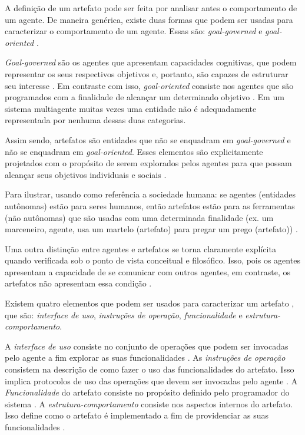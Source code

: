 A definição de um artefato pode ser feita por analisar antes o comportamento de um agente. De maneira genérica, existe duas formas que podem ser usadas para caracterizar o comportamento de um agente. Essas são: \textit{goal-governed} e \textit{goal-oriented} \cite{relationwithagentprogram} \cite{programingagentartefact}.

\textit{Goal-governed} são os agentes que apresentam capacidades cognitivas, que podem representar os seus respectivos objetivos e, portanto, são capazes de estruturar seu interesse \cite{relationwithagentprogram} \cite{programingagentartefact}. Em contraste com isso, \textit{goal-oriented} consiste nos agentes que são programados com a finalidade de alcançar um determinado objetivo \cite{relationwithagentprogram} \cite{programingagentartefact}. Em um sistema multiagente muitas vezes
uma entidade não é adequadamente representada por nenhuma dessas duas categorias. 

Assim sendo, artefatos são entidades que não se enquadram em  \textit{goal-governed} e não se enquadram em \textit{goal-oriented}. Esses elementos são explicitamente projetados com o propósito de serem explorados pelos agentes para que possam alcançar seus objetivos individuais e sociais \cite{programingagentartefact} \cite{cartago}. 

Para ilustrar, usando como referência a sociedade humana: se agentes (entidades autônomas) estão para seres humanos, então artefatos estão para as ferramentas (não autônomas) que são usadas com uma determinada finalidade (ex. um marceneiro, agente, usa um martelo (artefato) para pregar um prego (artefato)) \cite{programingagentartefact}.

Uma outra distinção entre agentes e artefatos se torna claramente explícita quando verificada sob o ponto de vista conceitual e filosófico. Isso, pois os agentes apresentam a capacidade de se comunicar com outros agentes, em contraste, os artefatos não apresentam essa condição \cite{programingagentartefact}.

Existem quatro elementos que podem ser usados para caracterizar um artefato \cite{programingagentartefact}, que são: \textit{interface de uso}, \textit{instruções de operação}, \textit{funcionalidade} e \textit{estrutura-comportamento}.

A \textit{interface de uso} consiste no conjunto de operações que podem ser invocadas pelo agente a fim explorar as suas funcionalidades \cite{programingagentartefact}. As \textit{instruções de operação} consistem na descrição de como fazer o uso das funcionalidades do artefato. Isso implica protocolos de uso das operações que devem ser invocadas pelo agente \cite{programingagentartefact}. A \textit{Funcionalidade} do artefato consiste no propósito definido pelo programador do sistema \cite{programingagentartefact}. A \textit{estrutura-comportamento} consiste nos aspectos internos do artefato. Isso define como o artefato é implementado a fim de providenciar as suas funcionalidades \cite{programingagentartefact}.    

